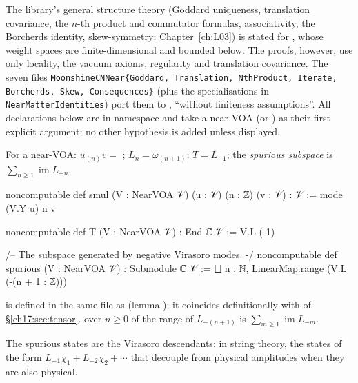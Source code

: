 The library's general structure theory (Goddard uniqueness, translation covariance, the $n$-th product and
commutator formulas, associativity, the Borcherds identity, skew-symmetry: Chapter~\ref{ch:L03}) is stated for
, whose weight spaces are finite-dimensional and bounded below.  The proofs, however, use
only locality, the vacuum axioms, regularity and translation covariance.  The seven files
\texttt{MoonshineCNNear\{Goddard, Translation, NthProduct, Iterate, Borcherds, Skew, Consequences\}} (plus the
specialisations in \texttt{NearMatterIdentities}) port them to , ``without finiteness assumptions''.
All declarations below are in namespace  and take a near-VOA  (or
) as their first explicit argument; no other hypothesis is added unless displayed.

\begin{definition}\label{ch17:def:nearops}
For a near-VOA: $u_{(n)}v=$ ; $L_n=\omega_{(n+1)}$; $T=L_{-1}$; the \emph{spurious subspace} is
$\sum_{n\ge1}\operatorname{im}L_{-n}$.
\end{definition}

\begin{leancode}
noncomputable def smul (V : NearVOA 𝒱) (u : 𝒱) (n : ℤ) (v : 𝒱) : 𝒱 := mode (V.Y u) n v

noncomputable def T (V : NearVOA 𝒱) : End ℂ 𝒱 := V.L (-1)

/-- The subspace generated by negative Virasoro modes. -/
noncomputable def spurious (V : NearVOA 𝒱) : Submodule ℂ 𝒱 :=
  ⨆ n : ℕ, LinearMap.range (V.L (-(n + 1 : ℤ)))
\end{leancode}

\begin{dictionary}
 is defined in the same file as  (lemma ); it coincides
definitionally with  of \S\ref{ch17:sec:tensor}.   over $n\ge0$ of the range of
$L_{-(n+1)}$ is $\sum_{m\ge1}\operatorname{im}L_{-m}$.
\end{dictionary}

\begin{physics}
The spurious states are the Virasoro descendants: in string theory, the states of the form $L_{-1}\chi_1+L_{-2}\chi_2+\cdots$
that decouple from physical amplitudes when they are also physical.
\end{physics}

